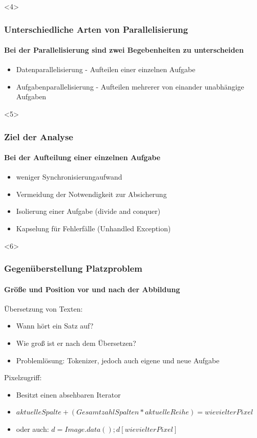 \documentclass{beamer}
\begin{document}
\begin{frame}<4>
  \frametitle{Unterschiedliche Arten von Parallelisierung}
  \framesubtitle{Bei der Parallelisierung sind zwei Begebenheiten zu unterscheiden}
  \begin{itemize}
    \item Datenparallelisierung - Aufteilen einer einzelnen Aufgabe
    \item Aufgabenparallelisierung - Aufteilen mehrerer von einander unabhängige Aufgaben
  \end{itemize}

\end{frame}

\begin{frame}<5>
  \frametitle{Ziel der Analyse}
  \framesubtitle{Bei der Aufteilung einer einzelnen Aufgabe}
  \begin{itemize}
    \item weniger Synchronisierungaufwand
    \item Vermeidung der Notwendigkeit zur Absicherung
    \item Isolierung einer Aufgabe  (divide and conquer)
    \item Kapselung für Fehlerfälle (Unhandled Exception)
  \end{itemize}

\end{frame}

\begin{frame}<6>
  \frametitle{Gegenüberstellung Platzproblem}
  \framesubtitle{Größe und Position vor und nach der Abbildung}
  Übersetzung von Texten:
  \begin{itemize}
    \item  Wann hört ein Satz auf? 
    \item  Wie groß ist er nach dem Übersetzen? 
    \item  Problemlösung: Tokenizer, jedoch auch eigene und neue Aufgabe
  \end{itemize}
  
  Pixelzugriff:
  \begin{itemize}
    \item  Besitzt einen absehbaren Iterator
    \item  $aktuelle Spalte+(Gesamtzahl Spalten*aktuelle Reihe) = wievielter Pixel$
    \item  oder auch: $d = Image.data(); d[wievielter Pixel]$
  \end{itemize}
  
\end{frame}
\end{document}
